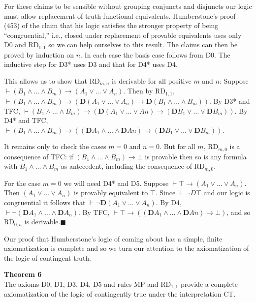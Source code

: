 \documentclass[
  11pt,
  letterpaper,
  DIV=11,
  numbers=noendperiod,
  twoside]{scrartcl}
\begin{document}
For these claims to be sensible without grouping conjuncts and disjuncts
our logic must allow replacement of truth-functional equivalents.
Humberstone's proof (453) of the claim that his logic satisfies the
stronger property of being ``congruential,'' i.e., closed under
replacement of provable equivalents uses only D0 and RD\(_{1,1}\) so we
can help ourselves to this result. The claims can then be proved by
induction on \(n\). In each case the basis case follows from D0. The
inductive step for D3* uses D3 and that for D4* uses D4.

This allows us to show that RD\(_{m,n}\) is derivable for all positive
\(m\) and \(n\): Suppose
\(\vdash (B_1 \wedge {\ldots}\wedge B_m) \rightarrow (A_1\vee {\ldots}\vee A_n)\).
Then by RD\(_{1,1}\),\\
\(\vdash (B_1 \wedge {\ldots}\wedge B_m) \rightarrow (\mathbf{D}(A_1\vee {\ldots}\vee A_n) \rightarrow \mathbf{D}(B_1 \wedge {\ldots}\wedge B_m))\).
By D3* and TFC,
\(\vdash (B_1 \wedge {\ldots}\wedge B_m) \rightarrow (\mathbf{D}(A_1\vee {\ldots}\vee An) \rightarrow (\mathbf{D}B_1 \vee {\ldots}\vee \mathbf{D}B_m))\).
By D4* and TFC,
\(\vdash (B_1 \wedge {\ldots}\wedge B_m) \rightarrow ((\mathbf{D}A_1\wedge {\ldots}\wedge \mathbf{D}An) \rightarrow (\mathbf{D}B_1 \vee {\ldots}\vee \mathbf{D}B_m))\).

It remains only to check the cases \(m{=}0\) and \(n{=}0\). But for all
\(m\), RD\(_{m,0}\) is a consequence of TFC: if
\((B_1\wedge {\ldots}\wedge B_m)\rightarrow \bot\) is provable then so
is any formula with \(B_1\wedge {\ldots}\wedge B_m\) as antecedent,
including the consequence of RD\(_{m,0}\).

For the case \(m=0\) we will need D4* and D5. Suppose
\(\vdash \top \rightarrow (A_1\vee {\ldots}\vee A_n)\). Then
\((A_1\vee {\ldots}\vee A_n)\) is provably equivalent to \(\top\). Since
\(\vdash \neg D\top\) and our logic is congruential it follows that
\(\vdash \neg \mathbf{D}(A_1\vee {\ldots}\vee A_n)\). By D4,
\(\vdash \neg (\mathbf{D}A_1\wedge {\ldots}\wedge \mathbf{D}A_n)\). By
TFC,
\(\vdash \top \rightarrow ( (\mathbf{D}A_1\wedge {\ldots}\wedge \mathbf{D}An) \rightarrow \bot)\),
and so RD\(_{0,n}\) is derivable.\(\blacksquare\)

Our proof that Humberstone's logic of coming about has a simple, finite
axiomatization is complete and so we turn our attention to the
axiomatization of the logic of contingent truth.

\textbf{Theorem 6}\\
The axioms D0, D1, D3, D4, D5 and rules MP and RD\(_{1,1}\) provide a
complete axiomatization of the logic of contingently true under the
interpretation CT.
\end{document}
